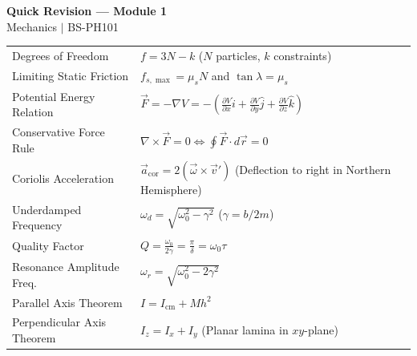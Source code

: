 \documentclass[12pt,a4paper]{article}
\renewcommand{\arraystretch}{1.45}
\begin{document}
\newpage
\begin{center}
  {\large\bfseries\color{myred} Quick Revision --- Module 1}\\[3pt]
  {\small\color{mydark} Mechanics $|$ BS-PH101}
\end{center}
\noindent{\color{myred}\rule{\linewidth}{1.2pt}}
\vspace{4pt}

\begin{tcolorbox}[formulabox, title={\textbf{Key Formulas and Metrics at a Glance}}]
\renewcommand{\arraystretch}{1.35}
\begin{tabularx}{\linewidth}{B{5.0cm} X}
Degrees of Freedom & $f = 3N - k$ \quad ($N$ particles, $k$ constraints) \\[4pt]
Limiting Static Friction & $f_{s,\max} = \mu_s N$ \quad and \quad $\tan\lambda = \mu_s$ \\[4pt]
Potential Energy Relation & $\vec{F} = -\nabla V = -\left(\frac{\partial V}{\partial x}\hat{i} + \frac{\partial V}{\partial y}\hat{j} + \frac{\partial V}{\partial z}\hat{k}\right)$ \\[4pt]
Conservative Force Rule & $\nabla \times \vec{F} = 0 \iff \oint \vec{F} \cdot d\vec{r} = 0$ \\[4pt]
Coriolis Acceleration & $\vec{a}_{\text{cor}} = 2(\vec{\omega} \times \vec{v}')$ \quad (Deflection to right in Northern Hemisphere) \\[4pt]
Underdamped Frequency & $\omega_d = \sqrt{\omega_0^2 - \gamma^2}$ \quad ($\gamma = b/2m$) \\[4pt]
Quality Factor & $Q = \frac{\omega_0}{2\gamma} = \frac{\pi}{\delta} = \omega_0 \tau$ \\[4pt]
Resonance Amplitude Freq. & $\omega_r = \sqrt{\omega_0^2 - 2\gamma^2}$ \\[4pt]
Parallel Axis Theorem & $I = I_{\text{cm}} + M h^2$ \\[4pt]
Perpendicular Axis Theorem & $I_z = I_x + I_y$ \quad (Planar lamina in $xy$-plane) \\[4pt]
\end{tabularx}
\end{tcolorbox}
\end{document}
